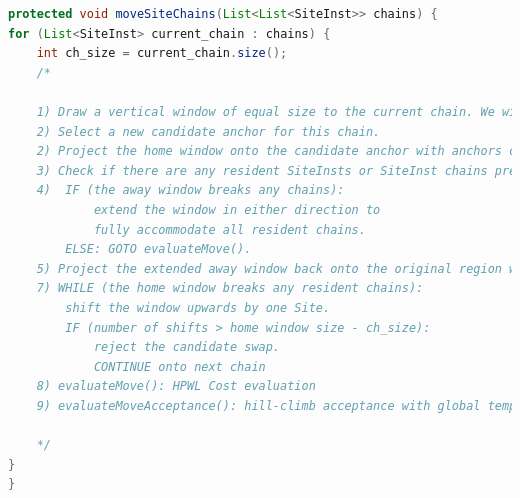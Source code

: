 \begin{lstlisting}[language=java, caption={Chain Swapping}, label={lst:chain_swap_pseudocode}]
protected void moveSiteChains(List<List<SiteInst>> chains) {
for (List<SiteInst> current_chain : chains) {
    int ch_size = current_chain.size();
    /*

    1) Draw a vertical window of equal size to the current chain. We will refer to this window as the "home window". 
    2) Select a new candidate anchor for this chain.
    2) Project the home window onto the candidate anchor with anchors coinciding. We will refer to this projected window as the "away window".
    3) Check if there are any resident SiteInsts or SiteInst chains present in the away window. Check if the away window breaks any resident SiteInst chains. 
    4)  IF (the away window breaks any chains): 
            extend the window in either direction to 
            fully accommodate all resident chains. 
        ELSE: GOTO evaluateMove(). 
    5) Project the extended away window back onto the original region with the tail of the window coinciding with the tail of the current chain. This projected window becomes the new home window. 
    7) WHILE (the home window breaks any resident chains):
        shift the window upwards by one Site. 
        IF (number of shifts > home window size - ch_size):
            reject the candidate swap.
            CONTINUE onto next chain
    8) evaluateMove(): HPWL Cost evaluation 
    9) evaluateMoveAcceptance(): hill-climb acceptance with global temperature

    */
}
}
\end{lstlisting}


